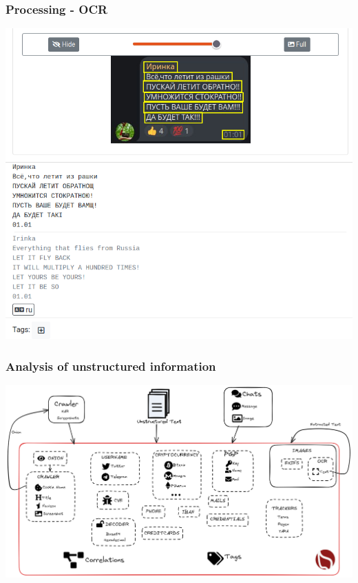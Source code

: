 \documentclass{beamer}
\begin{document}
\begin{frame}
    \frametitle{Processing - OCR}
    \begin{center}
        \includegraphics[scale=0.30]{screenshot/ail-ocr.png}
    \end{center}
\end{frame}

\begin{frame}
    \frametitle{Analysis of unstructured information}
    \begin{center}
        \includegraphics[scale=0.225]{images/ail-internal.png}
    \end{center}
\end{frame}
\end{document}
